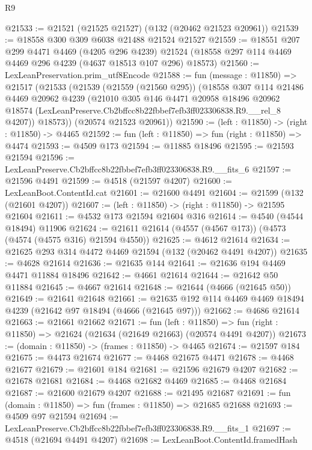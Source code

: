 \begin{lexlean}{R9}
\begin{coremodule}
@21533 := @21521 (@21525 @21527) (@132 (@20462 @21523 @20961))
@21539 := @18558 @300 @309 @6038 @21488 @21524 @21527
@21559 := @18551
    @207
    @299
    @4471
    @4469
    (@4205 @296 @4239)
    @21524
    (@18558 @297 @114 @4469 @4469 @296 @4239 (@4637 @18513 @107 @296) @18573)
@21560 := LexLeanPreservation.prim_utf8Encode
@21588 := fun (message : @11850) =>
  @21517
    (@21533
      (@21539
        (@21559 (@21560 @295))
        (@18558
          @307
          @114
          @21486
          @4469
          @20962
          @4239
          (@21010
            @305
            @146
            @4471
            @20958
            @18496
            @20962
            @18574
            (LexLeanPreserve.Cb2bffcc8b22fbbef7efb3ff023306838.R9.__rel_8 @4207))
          @18573))
      (@20574 @21523 @20961))
@21590 := (left : @11850) -> (right : @11850) -> @4465
@21592 := fun (left : @11850) => fun (right : @11850) => @4474
@21593 := @4509 @173
@21594 := @11885 @18496
@21595 := @21593 @21594
@21596 := LexLeanPreserve.Cb2bffcc8b22fbbef7efb3ff023306838.R9.__fits_6
@21597 := @21596 @4491
@21599 := @4518 (@21597 @4207)
@21600 := LexLeanBoot.ContentId.cat
@21601 := @21600 @4491
@21604 := @21599 (@132 (@21601 @4207))
@21607 := (left : @11850) -> (right : @11850) -> @21595 @21604
@21611 := @4532 @173 @21594 @21604 @316
@21614 := @4540 (@4544 @18494) @11906
@21624 := @21611 @21614 (@4557 (@4567 @173)) (@4573 (@4574 (@4575 @316) @21594 @4550))
@21625 := @4612 @21614
@21634 := @21625 @293 @314 @4472 @4469 @21594 (@132 (@20462 @4491 @4207))
@21635 := @4628 @21614
@21636 := @21635 @144
@21641 := @21636 @194 @4469 @4471 @11884 @18496
@21642 := @4661 @21614
@21644 := @21642 @50 @11884
@21645 := @4667 @21614
@21648 := @21644 (@4666 (@21645 @50))
@21649 := @21641 @21648
@21661 := @21635 @192 @114 @4469 @4469 @18494 @4239 (@21642 @97 @18494 (@4666 (@21645 @97)))
@21662 := @4686 @21614
@21663 := @21661 @21662
@21671 := fun (left : @11850) =>
  fun (right : @11850) => @21624 (@21634 (@21649 @21663) (@20574 @4491 @4207))
@21673 := (domain : @11850) -> (frames : @11850) -> @4465
@21674 := @21597 @184
@21675 := @4473 @21674
@21677 := @4468 @21675 @4471
@21678 := @4468 @21677
@21679 := @21601 @184
@21681 := @21596 @21679 @4207
@21682 := @21678 @21681
@21684 := @4468 @21682 @4469
@21685 := @4468 @21684
@21687 := @21600 @21679 @4207
@21688 := @21495 @21687
@21691 := fun (domain : @11850) => fun (frames : @11850) => @21685 @21688
@21693 := @4509 @97 @21594
@21694 := LexLeanPreserve.Cb2bffcc8b22fbbef7efb3ff023306838.R9.__fits_1
@21697 := @4518 (@21694 @4491 @4207)
@21698 := LexLeanBoot.ContentId.framedHash

\end{coremodule}
\end{lexlean}
